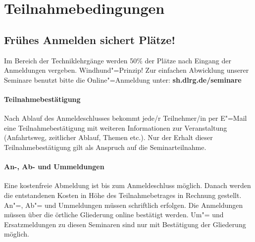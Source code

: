 

\renewcommand\myheadingtext{Gesamtverband | Organisatorisches}

\section*{Teilnahmebedingungen}
\subsection*{Frühes Anmelden sichert Plätze!}

Im Bereich der Techniklehrgänge werden 50\% der Plätze nach Eingang der Anmeldungen vergeben. Windhund"=Prinzip!
Zur einfachen Abwicklung unserer Seminare benutzt bitte die Online"=Anmeldung unter: \textbf{sh.dlrg.de/seminare}

\paragraph{Teilnahmebestätigung}
Nach Ablauf des Anmeldeschlusses bekommt jede/r Teilnehmer/in
per E"=Mail eine Teilnahmebestätigung mit weiteren Informationen
zur Veranstaltung (Anfahrtsweg, zeitlicher Ablauf, Themen etc.). Nur
der Erhalt dieser Teilnahmebestätigung gilt als Anspruch auf die Seminarteilnahme.

\paragraph{An-, Ab- und Ummeldungen}
Eine kostenfreie Abmeldung ist bis zum Anmeldeschluss möglich.
Danach werden die entstandenen Kosten in Höhe des Teilnahmebetrages in Rechnung gestellt. An"=, Ab"= und Ummeldungen müssen
schriftlich erfolgen.
Die Anmeldungen müssen über die örtliche Gliederung online bestätigt werden. Um"= und Ersatzmeldungen zu diesen Seminaren
sind nur mit Bestätigung der Gliederung möglich.

